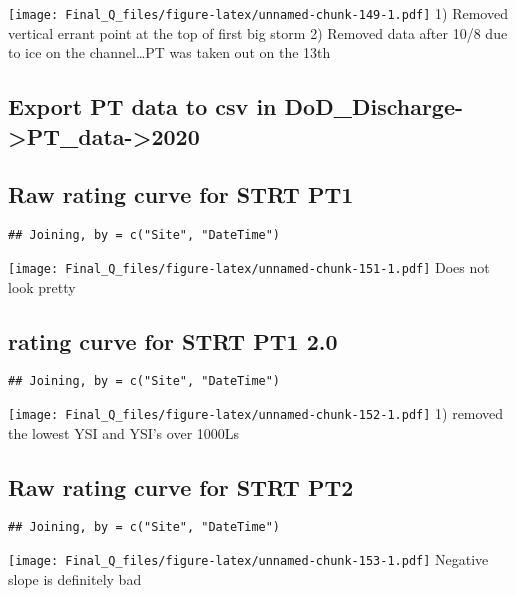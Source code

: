 \documentclass[
]{article}
\begin{document}
\texttt{[image: Final\_Q\_files/figure-latex/unnamed-chunk-149-1.pdf]} 1)
Removed vertical errant point at the top of first big storm 2) Removed
data after 10/8 due to ice on the channel\ldots PT was taken out on the
13th

\hypertarget{export-pt-data-to-csv-in-dod_discharge-pt_data-2020-4}{%
\subsection{Export PT data to csv in
DoD\_Discharge-\textgreater PT\_data-\textgreater2020}\label{export-pt-data-to-csv-in-dod_discharge-pt_data-2020-4}}

\hypertarget{raw-rating-curve-for-strt-pt1}{%
\subsection{Raw rating curve for STRT
PT1}\label{raw-rating-curve-for-strt-pt1}}

\begin{verbatim}
## Joining, by = c("Site", "DateTime")
\end{verbatim}

\texttt{[image: Final\_Q\_files/figure-latex/unnamed-chunk-151-1.pdf]}
Does not look pretty

\hypertarget{rating-curve-for-strt-pt1-2.0}{%
\subsection{rating curve for STRT PT1
2.0}\label{rating-curve-for-strt-pt1-2.0}}

\begin{verbatim}
## Joining, by = c("Site", "DateTime")
\end{verbatim}

\texttt{[image: Final\_Q\_files/figure-latex/unnamed-chunk-152-1.pdf]} 1)
removed the lowest YSI and YSI's over 1000Ls

\hypertarget{raw-rating-curve-for-strt-pt2}{%
\subsection{Raw rating curve for STRT
PT2}\label{raw-rating-curve-for-strt-pt2}}

\begin{verbatim}
## Joining, by = c("Site", "DateTime")
\end{verbatim}

\texttt{[image: Final\_Q\_files/figure-latex/unnamed-chunk-153-1.pdf]}
Negative slope is definitely bad
\end{document}

